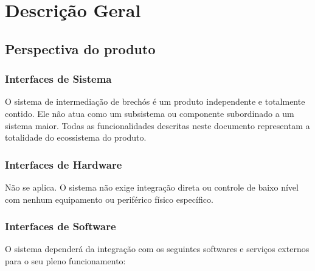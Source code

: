 \documentclass[
	article,			%
	11pt,				%
	oneside,			%
	a4paper,			%
	english,			%
	brazil,				%
	sumario=tradicional
	]{abntex2}
\begin{document}
\section{Descrição Geral}
\label{sec:DescricaoGeral}

\subsection{Perspectiva do produto}
\label{sec:PerspectivaProduto}

\subsubsection{Interfaces de Sistema}
\label{sec:InterfaceSistema}

O sistema de intermediação de brechós é um produto independente e totalmente contido. Ele não atua como um subsistema ou componente subordinado a um sistema maior. Todas as funcionalidades descritas neste documento representam a totalidade do ecossistema do produto.


\subsubsection{Interfaces de Hardware}
\label{sec:InterfaceHardware}

Não se aplica. O sistema não exige integração direta ou controle de baixo nível com nenhum equipamento ou periférico físico específico.

\subsubsection{Interfaces de Software}
\label{sec:InterfaceSoftware}

O sistema dependerá da integração com os seguintes softwares e serviços externos para o seu pleno funcionamento:
\end{document}
